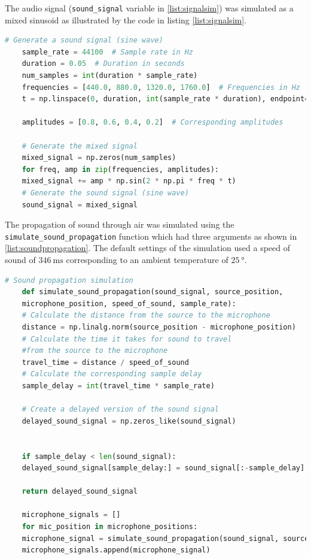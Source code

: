 \documentclass[a4paper,11pt]{article}
\begin{document}
The audio signal (\texttt{sound\_signal} variable in \ref{list:signalsim}) was simulated as a mixed sinusoid as illustrated by the code in listing \ref{list:signalsim}. 
\begin{lstlisting}[language=Python, caption={Showing code implementation of an audio signal with mixed freqencies ranging between $\SI{440}{\hertz}$ and $\SI{1760}{\hertz}$.}, label=list:signalsim]
	# Generate a sound signal (sine wave)
	sample_rate = 44100  # Sample rate in Hz
	duration = 0.05  # Duration in seconds
	num_samples = int(duration * sample_rate)
	frequencies = [440.0, 880.0, 1320.0, 1760.0]  # Frequencies in Hz
	t = np.linspace(0, duration, int(sample_rate * duration), endpoint=False)
	
	amplitudes = [0.8, 0.6, 0.4, 0.2]  # Corresponding amplitudes
	
	# Generate the mixed signal
	mixed_signal = np.zeros(num_samples)
	for freq, amp in zip(frequencies, amplitudes):
	mixed_signal += amp * np.sin(2 * np.pi * freq * t)
	# Generate the sound signal (sine wave)
	sound_signal = mixed_signal
\end{lstlisting}
The propagation of sound through air was simulated using the \texttt{simulate\_sound\_propagation} function which had three arguments as shown in \ref{list:soundpropagation}. The default settings of the simulation used a speed of sound of $\SI{346}{\meter\second}$ corresponding to an ambient temperature of $\SI{25}{\degree}$.
\begin{lstlisting}[language=Python, caption={Showing sound propagation simulated given a sinusoidal sound wave, the source position, and microphone positions in 3D.}, label=list:soundpropagation]
	# Sound propagation simulation
	def simulate_sound_propagation(sound_signal, source_position, 
	microphone_position, speed_of_sound, sample_rate):
	# Calculate the distance from the source to the microphone
	distance = np.linalg.norm(source_position - microphone_position)
	# Calculate the time it takes for sound to travel 
	#from the source to the microphone
	travel_time = distance / speed_of_sound
	# Calculate the corresponding sample delay
	sample_delay = int(travel_time * sample_rate)
	
	# Create a delayed version of the sound signal
	delayed_sound_signal = np.zeros_like(sound_signal)
	
	
	if sample_delay < len(sound_signal):
	delayed_sound_signal[sample_delay:] = sound_signal[:-sample_delay]
	
	return delayed_sound_signal
	
	microphone_signals = []
	for mic_position in microphone_positions:
	microphone_signal = simulate_sound_propagation(sound_signal, source_position, mic_position, speed_of_sound, sample_rate)
	microphone_signals.append(microphone_signal)
\end{lstlisting}
\end{document}
